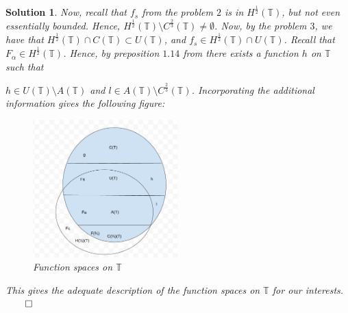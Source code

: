 \documentclass{article} %
\theoremstyle{quest}
\newtheorem*{solution}{Solution}
\begin{document}
\begin{solution}
Now, recall that $f_s$ from the problem $2$ is in $H^{\frac{1}{2}}(\mathbb{T})$, but not even essentially
bounded. Hence, $H^{\frac{1}{2}}(\mathbb{T}) \setminus C^{\frac{2}{3}}(\mathbb{T}) \neq \emptyset$. Now,
by the problem $3$, we have that $H^{\frac{1}{2}}(\mathbb{T}) \cap C(\mathbb{T}) \subset U(\mathbb{T})$,
and $f_s \in H^{\frac{1}{2}}(\mathbb{T}) \cap U(\mathbb{T})$. Recall that $F_{\alpha} \in H^{\frac{1}{2}}
(\mathbb{T})$. Hence, by preposition $1.14$ from there exists a function $h$ on $\mathbb{T}$ such that 

\newpage

$h \in U(\mathbb{T}) \setminus A(\mathbb{T})$ and $l \in A(\mathbb{T}) \setminus
C^{\frac{2}{3}}(\mathbb{T})$. Incorporating the additional information gives the following figure:

\begin{figure}[!ht]
  \caption{Function spaces on $\mathbb{T}$}
  \centering
    \includegraphics[width=0.5\textwidth]{fspace-2}
\end{figure}

This gives the adequate description of the function spaces on $\mathbb{T}$ for our interests.
\hfill $\qed$

\end{solution}

\bigskip
\end{document}
